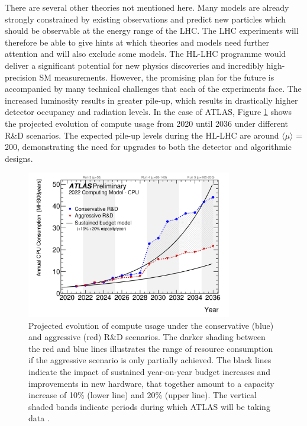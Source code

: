 

There are several other theories not mentioned here. Many models are already strongly constrained by existing observations and predict new particles which should be observable at the energy range of the LHC. The LHC experiments will therefore be able to give hints at which theories and models need further attention and will also exclude some models. The HL-LHC programme would deliver a significant potential for new physics discoveries and incredibly high-precision SM measurements. However, the promising plan for the future is accompanied by many technical challenges that each of the experiments face. The increased luminosity results in greater pile-up, which results in drastically higher detector occupancy and radiation levels. In the case of ATLAS, Figure \ref{fig:pileup-walltime} shows the projected evolution of compute usage from 2020 until 2036 under different R\&D scenarios. The expected pile-up levels during the HL-LHC are around $\langle \mu \rangle$ = 200, demonstrating the need for upgrades to both the detector and algorithmic designs.

\begin{figure}[!htbp]
  \centering
  \includegraphics[width=0.8\textwidth]{images/2-LHC-ATLAS/computing-model.png}
  \caption{
    Projected evolution of compute usage under the conservative (blue) and aggressive (red) R\&D scenarios. The darker shading between the red and blue lines illustrates the range of resource consumption if the aggressive scenario is only partially achieved. The black lines indicate the impact of sustained year-on-year budget increases and improvements in new hardware, that together amount to a capacity increase of 10\% (lower line) and 20\% (upper line). The vertical shaded bands indicate periods during which ATLAS will be taking data \cite{Collaboration:2802918}.
  }
  \label{fig:pileup-walltime}
\end{figure}


